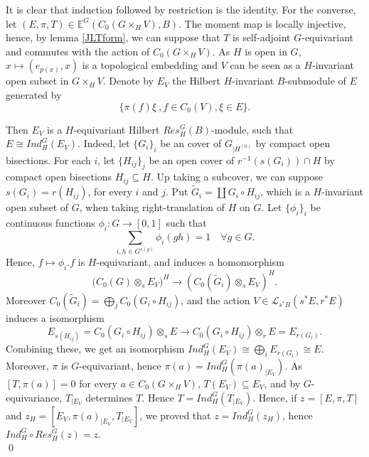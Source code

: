 \begin{dem}
It is clear that induction followed by restriction is the identity. For the converse, let $(E,\pi,T)\in \mathbb E^G(C_0(G\times_H V),B)$. The moment map is locally injective, hence, by lemma \ref{JLTform}, we can suppose that $T$ is self-adjoint $G$-equivariant and commutes with the action of $C_0(G\times_H V)$. As $H$ is open in $G$, $x\mapsto (e_{p(x)},x)$ is a topological embedding and $V$ can be seen as a $H$-invariant open subset in $G\times_H V$. Denote by $E_V$ the Hilbert $H$-invariant $B$-submodule of $E$ generated by 
\[\{\pi(f)\xi \ ,f\in C_0(V), \xi\in E\}.\]

Then $E_{V}$ is a $H$-equivariant Hilbert $Res_H^G(B)$-module, such that $E\cong Ind_H^G (E_V)$. Indeed, let $\{G_i\}_i$ be an cover of $G_{|H^{(0)}}$ by compact open bisections. For each $i$, let $\{H_{ij}\}_j$ be an open cover of $r^{-1}( s(G_i))\cap H$ by compact open bisections $H_{ij} \subseteq H$. Up taking a subcover, we can suppose $s(G_i) = r(H_{ij})$, for every $i$ and $j$. Put $\tilde G_i = \coprod G_i \circ H_{ij}$, which is a $H$-invariant open subset of $G$, when taking right-translation of $H$ on $G$. Let $\{\phi_i\}_i$ be continuous functions $\phi_i : G\rightarrow [0,1]$ such that 
\[\sum_{i, h\in G^{s(g)}} \phi_i(gh) = 1\quad \forall g\in G.\]
Hence, $f\mapsto \phi_i . f$ is $H$-equivariant, and induces a homomorphism 
\[\Big(C_0(G)\otimes_s E_V\Big)^H \rightarrow \left( C_0(\tilde G_i)\otimes_s E_V\right)^H .\] 
Moreover $C_0(\tilde G_i) = \bigoplus_j C_0(G_i\circ H_{ij})$, and the action $V\in \mathcal L_{s^*B}(s^* E, r^* E)$ induces a isomorphism
\[ E_{s(H_{ij})}=C_0(G_i\circ H_{ij})\otimes_s E \rightarrow C_0(G_i\circ H_{ij})\otimes_r E = E_{r(G_{i})}. \]
Combining these, we get an isomorphism $Ind_H^G (E_V) \cong \bigoplus_i E_{r(G_i)} \cong E $.\\

Moreover, $\pi$ is $G$-equivariant, hence $\pi(a) = Ind_H^G (\pi(a)_{|E_V} )$. As $[T,\pi(a)]=0$ for every $a\in C_0(G\times_H V)$, $T(E_V)\subseteq E_V$, and by $G$-equivariance, $T_{|E_V}$ determines $T$. Hence $T= Ind_H^G (T_{|E_V})$. Hence, if $z=[E,\pi,T]$ and $z_H =[E_V,\pi(a)_{|E_V},T_{|E_V}]$, we proved that $z = Ind_H^G( z_H)$, hence $Ind_H^G \circ Res_H^G (z)= z$.\\
\qed  
\end{dem}


